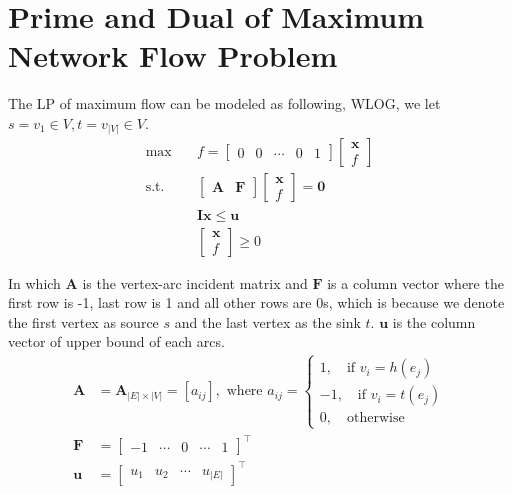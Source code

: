 		\section{Prime and Dual of Maximum Network Flow Problem}
			The LP of maximum flow can be modeled as following, WLOG, we let $s = v_1 \in V, t = v_{|V|} \in V$.
			\begin{align}
				\max \quad & f = \left[\begin{matrix}0 & 0 & \cdots & 0 & 1\end{matrix}\right]\left[\begin{matrix}\mathbf{x} \\ f\end{matrix}\right]\\
				\text{s.t.} \quad & \left[\begin{matrix}\mathbf{A} & \mathbf{F}\end{matrix}\right]\left[\begin{matrix}\mathbf{x}\\ f\end{matrix}\right] = \mathbf{0}\\
				& \mathbf{Ix} \le \mathbf{u}\\
				& \left[\begin{matrix}\mathbf{x}\\ f\end{matrix}\right] \ge 0
			\end{align}

			In which $\mathbf{A}$ is the vertex-arc incident matrix and $\mathbf{F}$ is a column vector where the first row is -1, last row is 1 and all other rows are 0s, which is because we denote the first vertex as source $s$ and the last vertex as the sink $t$. $\mathbf{u}$ is the column vector of upper bound of each arcs.
			\begin{align}
				\mathbf{A} &= \mathbf{A}_{|E|\times |V|} = [a_{ij}], \text{ where } a_{ij} = \begin{cases}
					1, \quad \text{if $v_i = h(e_j)$} \\
					-1, \quad \text{if $v_i = t(e_j)$} \\
					0, \quad \text{otherwise}
				\end{cases}\\
				\mathbf{F} &= \left[\begin{matrix}-1 & \cdots & 0 & \cdots & 1\end{matrix}\right]^\top \\
				\mathbf{u} &= \left[\begin{matrix}u_1 & u_2 & \cdots & u_{|E|}\end{matrix}\right]^\top
			\end{align}


